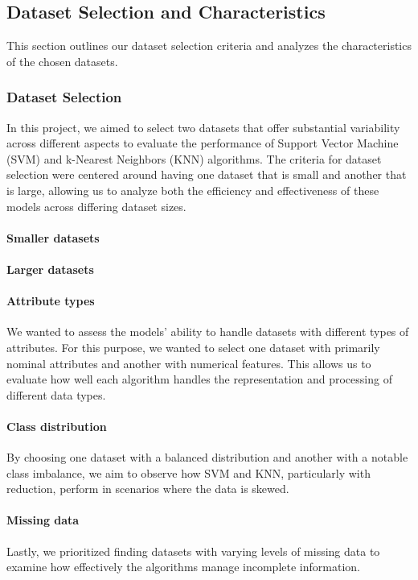\subsection{Dataset Selection and Characteristics}
\label{subsec:dataset}

This section outlines our dataset selection criteria and analyzes the characteristics of the chosen datasets.

\subsubsection{Dataset Selection}
In this project, we aimed to select two datasets that offer substantial variability across different aspects to evaluate the performance of Support Vector Machine (SVM) and k-Nearest Neighbors (KNN) algorithms.
The criteria for dataset selection were centered around having one dataset that is small and another that is large, allowing us to analyze both the efficiency and effectiveness of these models across differing dataset sizes.
\paragraph{Smaller datasets} 
\paragraph{Larger datasets} 

\paragraph{Attribute types} We wanted to assess the models' ability to handle datasets with different types of attributes.
For this purpose, we wanted to select one dataset with primarily nominal attributes and another with numerical features.
This allows us to evaluate how well each algorithm handles the representation and processing of different data types.
\paragraph{Class distribution} By choosing one dataset with a balanced distribution and another with a notable class imbalance, we aim to observe how SVM and KNN, particularly with reduction, perform in scenarios where the data is skewed.
\paragraph{Missing data} Lastly, we prioritized finding datasets with varying levels of missing data to examine how effectively the algorithms manage incomplete information.

